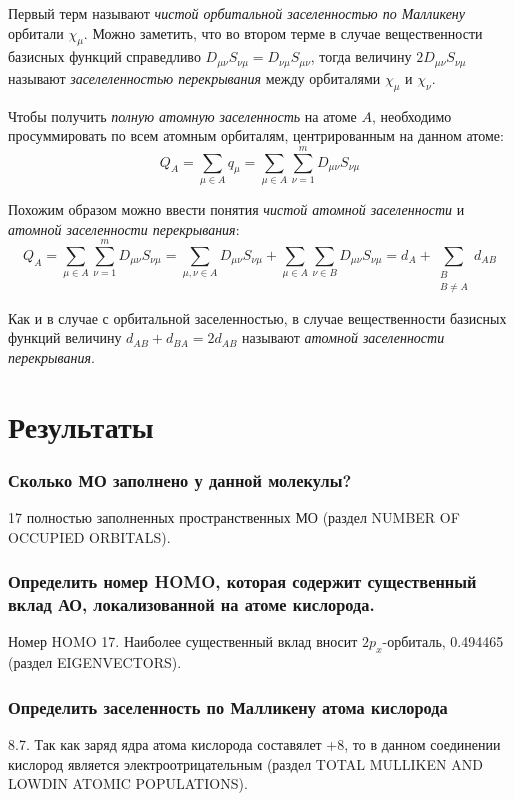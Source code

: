 Первый терм называют \textit{чистой орбитальной заселенностью по Малликену} орбитали $\chi_\mu$. Можно заметить, что во втором терме в случае вещественности базисных функций справедливо $D_{\mu\nu}S_{\nu\mu} = D_{\nu\mu}S_{\mu\nu}$, тогда величину
$2D_{\mu\nu}S_{\nu\mu}$ называют \textit{заселеленностью перекрывания} между орбиталями $\chi_\mu$ и $\chi_\nu$.

Чтобы получить \textit{полную атомную заселенность} на атоме $A$, необходимо просуммировать по всем атомным орбиталям, центрированным на данном атоме:
\begin{equation}
    Q_{A} = \sum\limits_{\mu\in A}q_{\mu} = \sum\limits_{\mu\in A}\sum\limits_{\nu=1}^{m}D_{\mu\nu}S_{\nu\mu}
\end{equation}

Похожим образом можно ввести понятия \textit{чистой атомной заселенности} и \textit{атомной заселенности перекрывания}:
\begin{equation}
    Q_{A} = \sum\limits_{\mu\in A}\sum\limits_{\nu=1}^{m}D_{\mu\nu}S_{\nu\mu} = \sum\limits_{\mu, \nu \in A}D_{\mu\nu}S_{\nu\mu} + \sum\limits_{\mu\in A}\sum\limits_{\nu\in B}D_{\mu\nu}S_{\nu\mu} = d_{A} + \sum\limits_{\substack{B \\ B \neq A}}d_{AB}
\end{equation}

Как и в случае с орбитальной заселенностью, в случае вещественности базисных функций величину $d_{AB} + d_{BA} = 2d_{AB}$ называют \textit{атомной заселенности перекрывания}.

\newpage
\section{Результаты}
\subsubsection*{Сколько МО заполнено у данной молекулы?}
17 полностью заполненных пространственных МО (раздел NUMBER OF OCCUPIED ORBITALS).

\subsubsection*{Определить номер HOMO, которая содержит существенный вклад АО, локализованной на атоме кислорода.}
Номер HOMO 17. Наиболее существенный вклад вносит $2p_x$-орбиталь, 0.494465 (раздел EIGENVECTORS).

\subsubsection*{Определить заселенность по Малликену атома кислорода}
8.7. Так как заряд ядра атома кислорода составялет +8, то в данном соединении кислород является электроотрицательным (раздел TOTAL MULLIKEN AND LOWDIN ATOMIC POPULATIONS).


